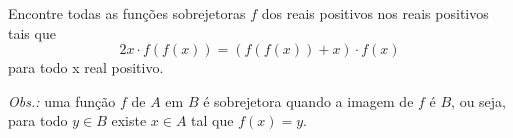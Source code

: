 Encontre todas as funções sobrejetoras $f$ dos reais positivos nos reais positivos tais que
$$2x \cdot f(f(x)) = (f(f(x)) + x) \cdot f(x)$$
para todo x real positivo.

\textit{Obs.:} uma função $f$ de $A$ em $B$ é sobrejetora quando a imagem de $f$ é $B$, ou seja, para todo $y \in B$ existe $x \in A$ tal que $f(x) = y$.